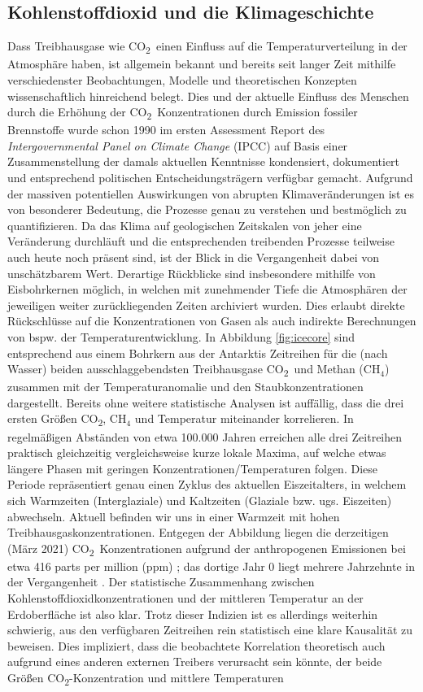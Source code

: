 \documentclass[12pt,a4paper,onecolumn,draft]{scrartcl}
\newcommand{\cotwo}{CO\textsubscript{2}}
\begin{document}
\subsection{Kohlenstoffdioxid und die Klimageschichte} \label{sec:Klima}
Dass Treibhausgase wie \cotwo \ einen Einfluss auf die Temperaturverteilung in der Atmosphäre haben, ist allgemein bekannt und bereits seit langer Zeit mithilfe verschiedenster Beobachtungen, Modelle und theoretischen Konzepten wissenschaftlich hinreichend belegt. Dies und der aktuelle Einfluss des Menschen durch die Erhöhung der \cotwo \ Konzentrationen durch Emission fossiler Brennstoffe wurde schon 1990 im ersten Assessment Report des \textit{Intergovernmental Panel on Climate Change} (IPCC) auf Basis einer Zusammenstellung der damals aktuellen Kenntnisse kondensiert, dokumentiert und entsprechend politischen Entscheidungsträgern verfügbar gemacht. Aufgrund der massiven potentiellen Auswirkungen von abrupten Klimaveränderungen \citep{IPCCpol.2018} ist es von besonderer Bedeutung, die Prozesse genau zu verstehen und bestmöglich zu quantifizieren. Da das Klima auf geologischen Zeitskalen von jeher eine Veränderung durchläuft und die entsprechenden treibenden Prozesse teilweise auch heute noch präsent sind, ist der Blick in die Vergangenheit dabei von unschätzbarem Wert. Derartige Rückblicke sind insbesondere mithilfe von Eisbohrkernen möglich, in welchen mit zunehmender Tiefe die Atmosphären der jeweiligen weiter zurückliegenden Zeiten archiviert wurden. Dies erlaubt direkte Rückschlüsse auf die Konzentrationen von Gasen als auch indirekte Berechnungen von bspw. der Temperaturentwicklung. In Abbildung \ref{fig:icecore} sind entsprechend aus einem Bohrkern aus der Antarktis Zeitreihen für die (nach Wasser) beiden ausschlaggebendsten Treibhausgase \cotwo \ und Methan (CH$_4$) zusammen mit der Temperaturanomalie und den Staubkonzentrationen dargestellt. Bereits ohne weitere statistische Analysen ist auffällig, dass die drei ersten Größen \cotwo , CH$_4$ und Temperatur miteinander korrelieren. In regelmäßigen Abständen von etwa 100.000 Jahren erreichen alle drei Zeitreihen praktisch gleichzeitig vergleichsweise kurze lokale Maxima, auf welche etwas längere Phasen mit geringen Konzentrationen/Temperaturen folgen. Diese Periode repräsentiert genau einen Zyklus des aktuellen Eiszeitalters, in welchem sich Warmzeiten (Interglaziale) und Kaltzeiten (Glaziale bzw. ugs. Eiszeiten) abwechseln. Aktuell befinden wir uns in einer Warmzeit mit hohen Treibhausgaskonzentrationen. Entgegen der Abbildung liegen die derzeitigen (März 2021) \cotwo \ Konzentrationen aufgrund der anthropogenen Emissionen bei etwa 416 parts per million (ppm) \citep{NASA.06.05.2021}; das dortige Jahr 0 liegt mehrere Jahrzehnte in der Vergangenheit \citep{Luthi.2008}. Der statistische Zusammenhang zwischen Kohlenstoffdioxidkonzentrationen und der mittleren Temperatur an der Erdoberfläche ist also klar.  Trotz dieser Indizien ist es allerdings weiterhin schwierig, aus den verfügbaren Zeitreihen rein statistisch eine klare Kausalität zu beweisen. Dies impliziert, dass die beobachtete Korrelation theoretisch auch aufgrund eines anderen externen Treibers verursacht sein könnte, der beide Größen \cotwo -Konzentration und mittlere Temperaturen 
\end{document}
